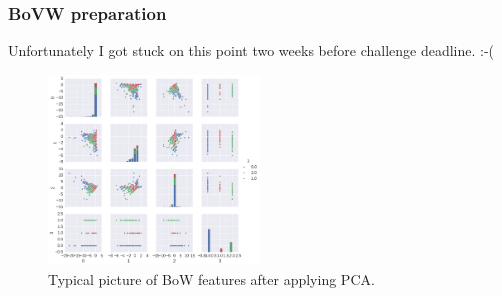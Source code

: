 \begin{frame}\frametitle{BoVW preparation}
\par Unfortunately I got stuck on this point two weeks before challenge deadline. :-(
\begin{center}
\begin{figure}
\includegraphics[width=0.5\textwidth]{pics/bow_pca_results.png}
\caption{Typical picture of BoW features  after applying PCA.}
\end{figure}
\end{center}
\end{frame}